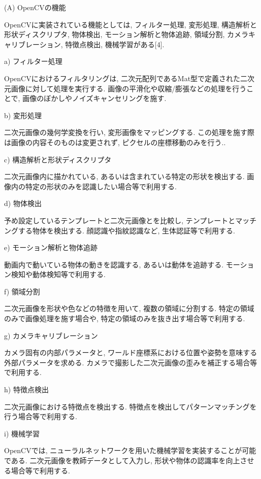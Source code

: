 \begin{description}
\item (A) OpenCVの機能

OpenCVに実装されている機能としては, フィルター処理, 変形処理, 構造解析と形状ディスクリプタ, 物体検出, モーション解析と物体追跡, 領域分割, カメラキャリブレーション, 特徴点検出, 機械学習がある[4].

\begin{description}
\item a) フィルター処理

OpenCVにおけるフィルタリングは, 二次元配列であるMat型で定義された二次元画像に対して処理を実行する.
画像の平滑化や収縮/膨張などの処理を行うことで, 画像のぼかしやノイズキャンセリングを施す.

\item b) 変形処理

二次元画像の幾何学変換を行い, 変形画像をマッピングする.
この処理を施す際は画像の内容そのものは変更されず, ピクセルの座標移動のみを行う..

\item c) 構造解析と形状ディスクリプタ

二次元画像内に描かれている, あるいは含まれている特定の形状を検出する.
画像内の特定の形状のみを認識したい場合等で利用する.

\item d) 物体検出

予め設定しているテンプレートと二次元画像とを比較し, テンプレートとマッチングする物体を検出する.
顔認識や指紋認識など, 生体認証等で利用する.

\item e) モーション解析と物体追跡

動画内で動いている物体の動きを認識する, あるいは動体を追跡する.
モーション検知や動体検知等で利用する.

\item f) 領域分割

二次元画像を形状や色などの特徴を用いて, 複数の領域に分割する.
特定の領域のみで画像処理を施す場合や, 特定の領域のみを抜き出す場合等で利用する.

\item g) カメラキャリブレーション

カメラ固有の内部パラメータと, ワールド座標系における位置や姿勢を意味する外部パラメータを求める.
カメラで撮影した二次元画像の歪みを補正する場合等で利用する.

\item h) 特徴点検出

二次元画像における特徴点を検出する.
特徴点を検出してパターンマッチングを行う場合等で利用する.

\item i) 機械学習

OpenCVでは, ニューラルネットワークを用いた機械学習を実装することが可能である.
二次元画像を教師データとして入力し, 形状や物体の認識率を向上させる場合等で利用する.
\end{description}

\end{description}

